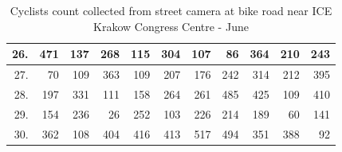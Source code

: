 \begin{table}[H]
{\begin{tabular}{|r|r|r|r|r|r|r|r|r|r|r|}
26.                    & 471                            & 137                             & 268                              & 115                              & 304                              & 107                              & 86                               & 364                              & 210                              & 243                              \\ \hline
27.                    & 70                             & 109                             & 363                              & 109                              & 207                              & 176                              & 242                              & 314                              & 212                              & 395                              \\ \hline
28.                    & 197                            & 331                             & 111                              & 158                              & 264                              & 261                              & 485                              & 425                              & 109                              & 410                              \\ \hline
29.                    & 154                            & 236                             & 26                               & 252                              & 103                              & 226                              & 214                              & 189                              & 60                               & 141                              \\ \hline
30.                    & 362                            & 108                             & 404                              & 416                              & 413                              & 517                              & 494                              & 351                              & 388                              & 92                               \\ \hline
\end{tabular}}
\caption{Cyclists count collected from street camera at bike road near ICE Krakow Congress Centre - June}
\label{tab:iceCountJune}
\end{table}

